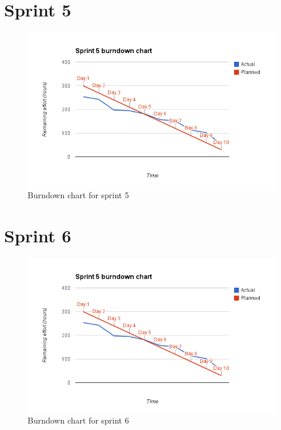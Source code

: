 \section{Sprint 5}
\begin{figure}[H]
\includegraphics[width=\textwidth]{appendix/backlog/burndown5.png}
\caption{Burndown chart for sprint 5}
\end{figure}


\section{Sprint 6}
\begin{figure}[H]
\includegraphics[width=\textwidth]{appendix/backlog/burndown5.png}
\caption{Burndown chart for sprint 6}
\end{figure}


